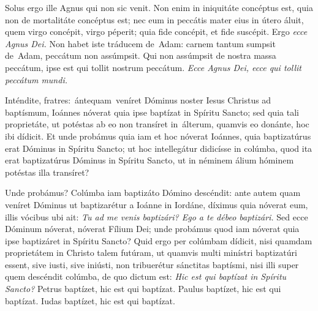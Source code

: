 {{\noindent Solus ergo ille Agnus qui non sic venit. Non enim in iniquitáte concéptus est, quia non de mortalitáte concéptus est; nec eum in peccátis mater eius in útero áluit, quem virgo concépit, virgo péperit; quia fide concépit, et fide suscépit. Ergo \emph{ecce Agnus Dei.} Non habet iste tráducem de Adam: carnem tantum sumpsit de Adam, peccátum non assúmpsit. Qui non assúmpsit de nostra massa peccátum, ipse est qui tollit nostrum peccátum. \emph{Ecce Agnus Dei, ecce qui tollit peccátum mundi.}}

\noindent Inténdite, fratres: ántequam veníret Dóminus noster Iesus Christus ad baptísmum, Ioánnes nóverat quia ipse baptízat in Spíritu Sancto; sed quia tali proprietáte, ut potéstas ab eo non transíret in álterum, quamvis eo donánte, hoc ibi dídicit. Et unde probámus quia iam et hoc nóverat Ioánnes, quia baptizatúrus erat Dóminus in Spíritu Sancto; ut hoc intellegátur didicísse in colúmba, quod ita erat baptizatúrus Dóminus in Spíritu Sancto, ut in néminem álium hóminem potéstas illa transíret?

\noindent Unde probámus? Colúmba iam baptizáto Dómino descéndit: ante autem quam veníret Dóminus ut baptizarétur a Ioánne in Iordáne, díximus quia nóverat eum, illis vócibus ubi ait: \emph{Tu ad me venis baptizári? Ego a te débeo baptizári.} Sed ecce Dóminum nóverat, nóverat Fílium Dei; unde probámus quod iam nóverat quia ipse baptizáret in Spíritu Sancto? Quid ergo per colúmbam dídicit, nisi quamdam proprietátem in Christo talem futúram, ut quamvis multi minístri baptizatúri essent, sive iusti, sive iniústi, non tribuerétur sánctitas baptísmi, nisi illi super quem descéndit colúmba, de quo dictum est: \emph{Hic est qui baptízat in Spíritu Sancto?} Petrus baptízet, hic est qui baptízat. Paulus baptízet, hic est qui baptízat. Iudas baptízet, hic est qui baptízat.
\vfill
\pagebreak

 

\vspace{-5mm}


\vfill
\pagebreak
}
\newcommand{\hymnuslaudes}{\pars{Hymnus} \scriptura{Alcuinus (\olddag{} 804)}

\cuminitiali{IV}{temporalia/hym-EcceIam.gtex}}
\newcommand{\benedictus}{\pars{Canticum Zachariæ.} \scriptura{Io. 2, 3.7.9; \textbf{H81}}

\vspace{-4mm}

\antiphona{I f}{temporalia/ant-deficientevino.gtex}

\vspace{-2mm}

\scriptura{Lc. 1, 68-79}

\vspace{-2mm}

\cantusSineNeumas
\initiumpsalmi{temporalia/benedictus-initium-isoll-f-auto.gtex}


 \Abardot{}}


